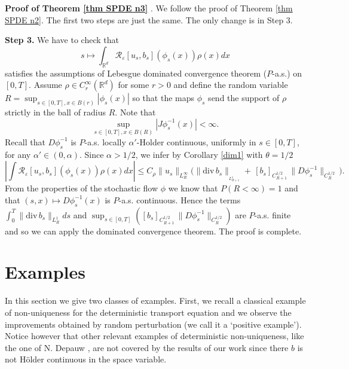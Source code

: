 \documentclass[a4paper,11pt]{article}
\begin{document}
\textbf{Proof of Theorem \ref{thm SPDE n3} }. We follow the proof of
Theorem \ref{thm SPDE n2}. The first two steps are just the same.
The only change is in  Step 3.

\smallskip\textbf{Step 3.} We have to check that
$$ s\mapsto\int_{\mathbb{R} ^d}
\mathcal{R}_{\varepsilon}\left[  u_{s} ,b_{s}\right] \left(
{\phi}_{s}(x)\right)  \rho\left(  x\right) dx
$$ satisfies
the assumptions of Lebesgue dominated convergence theorem ($P$-a.s.)
on $[0,T]$.
  Assume $\rho \in C_r^\infty(
\mathbb{R}^{d})$ for some $r > 0$ and define the random variable
 $R = \sup_{s\in[0,T],x\in B(r)}
|\phi_s(x)|$ so that the maps $\phi_s$ send the support of $\rho$
strictly in the ball of radius $R$. Note that
$$
\sup_{s\in[0,T],x\in B(R)} |J\phi_s^{-1}(x)| < \infty.
$$
 Recall that $ D\phi^{-1}_s $ is $P$-a.s. locally $\alpha'$-Holder
continuous, uniformly in $s \in [0,T]$,
 for any $\alpha' \in (0, \alpha)$. Since $\alpha > 1/2$, we infer
  by Corollary  \ref{dim1} with $\theta = 1/2$
 $$
\left|\int \mathcal{R}_{\varepsilon}\left[  u_{s} ,b_{s}\right]
\left( {\phi}_{s}(x)\right)  \rho\left(  x\right) dx \right| \le
 C_{\rho} \| u_s\|_{L^{\infty}_{R}}
 \big(
 \| {\mathrm{div}\,} b_s
\|_{_{L_{R+1}^{1}}} +  \, [ b_s ]_{C^{1/2}_{R+1}}  \, \|
 D\phi^{-1}_s\| _{C^{1/2}_{R}}  \,
 \big).
$$
From the properties of the stochastic flow ${\phi}$ we know that $P(R
< \infty)=1$ and that $(  s,x) \mapsto D{\phi}_{s}^{-1}( x) $ is
$P$-a.s. continuous. Hence the terms $\int_{0}^{T}\| {\mathrm{div}\,
}b_{s}\| _{L_{R}^{1}}ds$ and $\sup_{s\in\left[ 0,T\right]  }([ b_s
]_{C^{1/2}_{R+1}}  \, \|
 D\phi^{-1}_s\| _{C^{1/2}_{R}})$ are $P$-a.s. finite
and so we can apply  the dominated convergence theorem. The proof is
complete.



\section{Examples}

\label{sec:examples}

In this section we give two classes of examples. First, we recall a
classical example of non-uniqueness for the deterministic transport equation
and we observe the improvements obtained by random perturbation (we call it
a `positive example'). Notice however that other relevant examples of
deterministic non-uniqueness, like the one of N. Depauw \cite{Dep}, are not
covered by the results of our work since there $b$ is not H\"{o}lder
continuous in the space variable.
\end{document}
